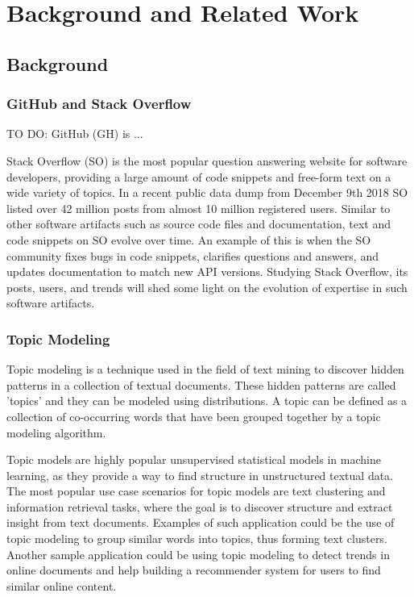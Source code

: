 \chapter{Background and Related Work}

\section{Background}

    \subsection{GitHub and Stack Overflow}
        TO DO: GitHub (GH) is ...
    
        Stack Overflow (SO) is the most popular question answering website for software developers, providing a large amount of code snippets and free-form text on a wide variety of topics. In a recent public data dump from December 9th 2018 SO listed over 42 million posts from almost 10 million registered users. Similar to other software artifacts such as source code files and documentation, text and code snippets on SO evolve over time. An example of this is when the SO community fixes bugs in code snippets, clarifies questions and answers, and updates documentation to match new API versions. Studying Stack Overflow, its posts, users, and trends will shed some light on the evolution of expertise in such software artifacts.
    
    
    \subsection{Topic Modeling}
        
        Topic modeling is a technique used in the field of text mining to discover hidden patterns in a collection of textual documents. These hidden patterns are called 'topics' and they can be modeled using distributions. A topic can be defined as a collection of co-occurring words that have been grouped together by a topic modeling algorithm.
        
        Topic models are highly popular unsupervised statistical models in machine learning, as they provide a way to find structure in unstructured textual data. The most popular use case scenarios for topic models are text clustering and information retrieval tasks, where the goal is to discover structure and extract insight from text documents. Examples of such application could be the use of topic modeling to group similar words into topics, thus forming text clusters. Another sample application could be using topic modeling to detect trends in online documents and help building a recommender system for users to find similar online content. 
        
